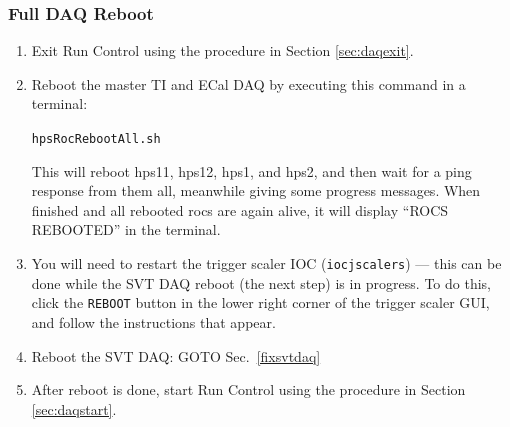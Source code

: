 \documentclass[12pt]{article}
\begin{document}
\subsubsection{Full DAQ Reboot}
\label{fixdaqbig}

\begin{enumerate}
\item Exit Run Control using the procedure in Section \ref{sec:daqexit}.
\item Reboot the master TI and ECal DAQ by executing this command in a terminal:\newline
\centerline{\texttt{hpsRocRebootAll.sh}}
This will reboot hps11, hps12, hps1, and hps2, and then wait for a ping response from them all, meanwhile giving some progress messages.  When finished and all rebooted rocs are again alive, it will display ``ROCS REBOOTED'' in the terminal.

\item You will need to restart the trigger scaler IOC (\texttt{iocjscalers}) --- this can be done while the SVT DAQ reboot (the next step) is in progress. To do this, click the \texttt{REBOOT} button in the lower right corner of the trigger scaler GUI, and follow the instructions that appear.

\item Reboot the SVT DAQ: GOTO Sec.~\ref{fixsvtdaq}

\item After reboot is done, start Run Control using the procedure in Section \ref{sec:daqstart}.
\end{enumerate}
\end{document}
